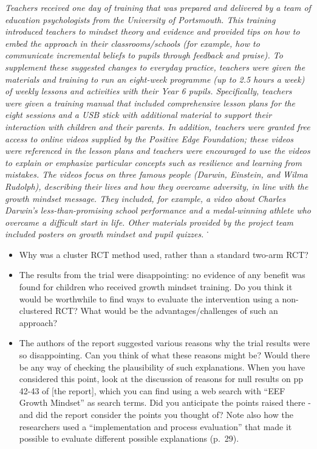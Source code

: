 \documentclass{krantz}
\begin{document}
\emph{Teachers received one day of training that was prepared and delivered by a team of education psychologists from the University of Portsmouth. This training introduced teachers to mindset theory and evidence and provided tips on how to embed the approach in their classrooms/schools (for example, how to communicate incremental beliefs to pupils through feedback and praise). To supplement these suggested changes to everyday practice, teachers were given the materials and training to run an eight-week programme (up to 2.5 hours a week) of weekly lessons and activities with their Year 6 pupils. Specifically, teachers were given a training manual that included comprehensive lesson plans for the eight sessions and a USB stick with additional material to support their interaction with children and their parents. In addition, teachers were granted free access to online videos supplied by the Positive Edge Foundation; these videos were referenced in the lesson plans and teachers were encouraged to use the videos to explain or emphasize particular concepts such as resilience and learning from mistakes. The videos focus on three famous people (Darwin, Einstein, and Wilma Rudolph), describing their lives and how they overcame adversity, in line with the growth mindset message. They included, for example, a video about Charles Darwin's less-than-promising school performance and a medal-winning athlete who overcame a difficult start in life. Other materials provided by the project team included posters on growth mindset and pupil quizzes.} ˙

\begin{itemize}
\item
  Why was a cluster RCT method used, rather than a standard two-arm RCT?
\item
  The results from the trial were disappointing: no evidence of any benefit was found for children who received growth mindset training. Do you think it would be worthwhile to find ways to evaluate the intervention using a non-clustered RCT? What would be the advantages/challenges of such an approach?
\item
  The authors of the report suggested various reasons why the trial results were so disappointing. Can you think of what these reasons might be? Would there be any way of checking the plausibility of such explanations. When you have considered this point, look at the discussion of reasons for null results on pp 42-43 of {[}the report{]}, which you can find using a web search with ``EEF Growth Mindset'' as search terms. Did you anticipate the points raised there - and did the report consider the points you thought of? Note also how the researchers used a ``implementation and process evaluation'' that made it possible to evaluate different possible explanations (p.~29).
\end{itemize}
\end{document}
